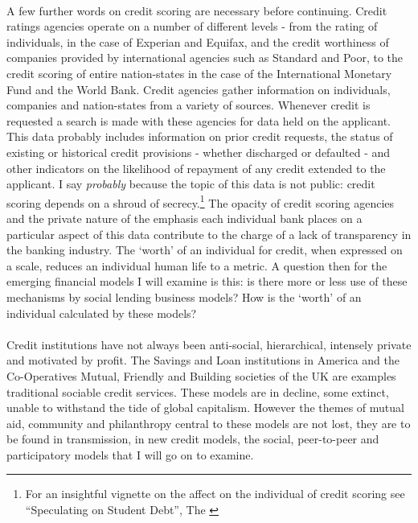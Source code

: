 \documentclass[12pt,a4paper,titlepage]{article}
\begin{document}
\paragraph{}A few further words on credit scoring are necessary before continuing. Credit ratings agencies operate on a number of different levels - from the rating of individuals, in the case of Experian and Equifax, and the credit worthiness of companies provided by international agencies such as Standard and Poor, to the credit scoring of entire nation-states in the case of the International Monetary Fund and the World Bank. Credit agencies gather information on individuals, companies and nation-states from a variety of sources. Whenever credit is requested a search is made with these agencies for data held on the applicant. This data probably includes information on prior credit requests, the status of existing or historical credit provisions - whether discharged or defaulted - and other indicators on the likelihood of repayment of any credit extended to the applicant. I say \textit{probably} because the topic of this data is not public: credit scoring depends on a shroud of secrecy.\footnote{For an insightful vignette on the affect on the individual of credit scoring see ``Speculating on Student Debt'', The \cite{committee:2007pb}} The opacity of credit scoring agencies and the private nature of the emphasis each individual bank places on a particular aspect of this data contribute to the charge of a lack of transparency in the banking industry. The `worth' of an individual for credit, when expressed on a scale, reduces an individual human life to a metric. A question then for the emerging financial models I will examine is this: is there more or less use of these mechanisms by social lending business models? How is the `worth' of an individual calculated by these models?

\paragraph{}Credit institutions have not always been anti-social, hierarchical, intensely private and motivated by profit. The Savings and Loan institutions in America and the Co-Operatives Mutual, Friendly and Building societies of the UK are examples traditional sociable credit services. These models are in decline, some extinct, unable to withstand the tide of global capitalism. However the themes of mutual aid, community and philanthropy central to these models are not lost, they are to be found in transmission, in new credit models, the social, peer-to-peer and participatory models that I will go on to examine.
\end{document}
